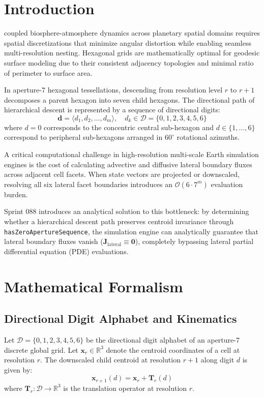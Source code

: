 \documentclass[10pt,journal,compsoc]{IEEEtran}
\begin{document}
\section{Introduction}
 coupled biosphere-atmosphere dynamics across planetary spatial domains requires spatial discretizations that minimize angular distortion while enabling seamless multi-resolution nesting. Hexagonal grids are mathematically optimal for geodesic surface modeling due to their consistent adjacency topologies and minimal ratio of perimeter to surface area.

In aperture-7 hexagonal tessellations, descending from resolution level $r$ to $r+1$ decomposes a parent hexagon into seven child hexagons. The directional path of hierarchical descent is represented by a sequence of directional digits:
\begin{equation}
\mathbf{d} = \langle d_1, d_2, \dots, d_m \rangle, \quad d_k \in \mathcal{D} = \{0, 1, 2, 3, 4, 5, 6\}
\end{equation}
where $d = 0$ corresponds to the concentric central sub-hexagon and $d \in \{1, \dots, 6\}$ correspond to peripheral sub-hexagons arranged in $60^\circ$ rotational azimuths.

A critical computational challenge in high-resolution multi-scale Earth simulation engines is the cost of calculating advective and diffusive lateral boundary fluxes across adjacent cell facets. When state vectors are projected or downscaled, resolving all six lateral facet boundaries introduces an $\mathcal{O}(6 \cdot 7^m)$ evaluation burden. 

Sprint 088 introduces an analytical solution to this bottleneck: by determining whether a hierarchical descent path preserves centroid invariance through \texttt{hasZeroApertureSequence}, the simulation engine can analytically guarantee that lateral boundary fluxes vanish ($\mathbf{J}_{\text{lateral}} \equiv \mathbf{0}$), completely bypassing lateral partial differential equation (PDE) evaluations.

\section{Mathematical Formalism}

\subsection{Directional Digit Alphabet and Kinematics}
Let $\mathcal{D} = \{0, 1, 2, 3, 4, 5, 6\}$ be the directional digit alphabet of an aperture-7 discrete global grid. Let $\mathbf{x}_r \in \mathbb{R}^3$ denote the centroid coordinates of a cell at resolution $r$. The downscaled child centroid at resolution $r+1$ along digit $d$ is given by:
\begin{equation}
\mathbf{x}_{r+1}(d) = \mathbf{x}_r + \mathbf{T}_r(d)
\end{equation}
where $\mathbf{T}_r: \mathcal{D} \to \mathbb{R}^3$ is the translation operator at resolution $r$.
\end{document}
